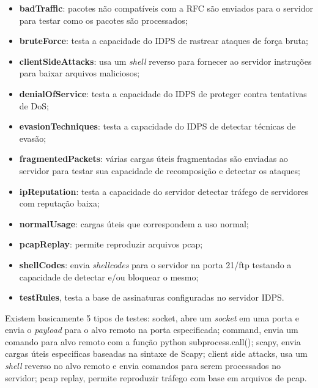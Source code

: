 \documentclass[
	12pt,				
	openright,		
	twoside,	
	a4paper,
	english,	
	brazil	
	]{abntex2}
\begin{document}
 \begin{itemize}
  \item \textbf{badTraffic}: pacotes não compatíveis com a RFC são enviados para o servidor para testar como os pacotes são processados; 
  \item \textbf{bruteForce}: testa a capacidade do IDPS de rastrear ataques de força bruta;
  \item \textbf{clientSideAttacks}: usa um \textit{shell} reverso para fornecer ao servidor instruções para baixar arquivos maliciosos; 
  \item \textbf{denialOfService}: testa a capacidade do IDPS de proteger contra tentativas de DoS; 
  \item \textbf{evasionTechniques}: testa a capacidade do IDPS de detectar técnicas de evasão; 
  \item \textbf{fragmentedPackets}: várias cargas úteis fragmentadas são enviadas ao servidor para testar sua capacidade de recomposição e detectar os ataques; 
  \item \textbf{ipReputation}: testa a capacidade do servidor detectar tráfego de servidores com reputação baixa;
  \item \textbf{normalUsage}: cargas úteis que correspondem a uso normal; 
  \item \textbf{pcapReplay}: permite reproduzir arquivos pcap; 
  \item \textbf{shellCodes}: envia \textit{shellcodes} para o servidor na porta 21/ftp testando a capacidade de detectar e/ou bloquear o mesmo; 
  \item \textbf{testRules}, testa a base de assinaturas configuradas no servidor IDPS.
 \end{itemize}

 Existem basicamente 5 tipos de testes: socket, abre um \textit{socket} em uma porta e envia o \textit{payload} para o alvo remoto na porta especificada; command, envia um comando para alvo remoto com a função python subprocess.call(); scapy, envia cargas úteis especificas baseadas na sintaxe de Scapy; client side attacks, usa um \textit{shell} reverso no alvo remoto e envia comandos para serem processados no servidor; pcap replay, permite reproduzir tráfego com base em arquivos de pcap.
\end{document}
